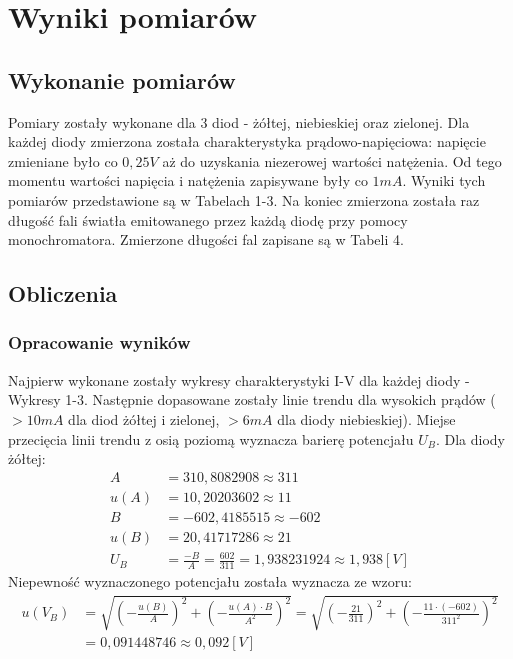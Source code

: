 \documentclass[polish, 11pt, a4paper]{article}
\begin{document}
	\section{Wyniki pomiarów}
		
	\subsection{Wykonanie pomiarów}
		Pomiary zostały wykonane dla 3 diod - żółtej, niebieskiej oraz zielonej.
		Dla każdej diody zmierzona została charakterystyka prądowo-napięciowa: napięcie zmieniane było co \(0,25 V\) aż do uzyskania niezerowej wartości natężenia.
		Od tego momentu wartości napięcia i natężenia zapisywane były co \(1mA\).
		Wyniki tych pomiarów przedstawione są w Tabelach 1-3.
		Na koniec zmierzona została raz długość fali światła emitowanego przez każdą diodę przy pomocy monochromatora.
		Zmierzone długości fal zapisane są w Tabeli 4.
	\subsection{Obliczenia}
	
	\subsubsection{Opracowanie wyników}
		Najpierw wykonane zostały wykresy charakterystyki I-V dla każdej diody - Wykresy 1-3.
		Następnie dopasowane zostały linie trendu dla wysokich prądów (\(>10mA\) dla diod żółtej i zielonej, \(>6mA\) dla diody niebieskiej).
		Miejse przecięcia linii trendu z osią poziomą wyznacza barierę potencjału \(U_B\). Dla diody żółtej:
		\begin{align*}
			A	&= 310,8082908 \approx 311\\			
			u(A)&=	10,20203602 \approx 11\\
			B	&=	-602,4185515 \approx -602\\
			u(B)&= 20,41717286 \approx 21\\			
			U_B	&=	\frac{-B}{A} = \frac{602}{311} = 1,938231924 \approx 1,938 [V]			
		\end{align*}
		Niepewność wyznaczonego potencjału została wyznacza ze wzoru:
		\begin{align*}
			u(V_B)	&= \sqrt{\left(-\frac{u(B)}{A}\right)^2+\left(-\frac{u(A)\cdot B}{A^2}\right)^2}
					 = \sqrt{\left(-\frac{21}{311}\right)^2+\left(-\frac{11\cdot (-602)}{311^2}\right)^2}\\
					& = 0,091448746	\approx 0,092 [V]
		\end{align*}	
\end{document}
